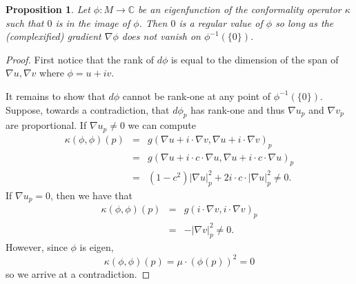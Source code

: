 \documentclass[11pt,reqno]{amsart}
\theoremstyle{plain}
\newtheorem{proposition}  [theorem]  {Proposition}
\theoremstyle{definition}
\numberwithin{equation}{section}
\def \cn{{\mathbb C}}
\numberwithin{equation}{section}
\begin{document}
\begin{proposition}
	Let $\phi: M \to \cn$ be an eigenfunction of the conformality operator $\kappa$ such that $0$ is in the image of $\phi$. Then $0$ is a regular value of $\phi$ so long as the (complexified) gradient $\nabla \phi$ does not vanish on $\phi^{-1}(\{0\})$.
\end{proposition}
\begin{proof}
	First notice that the rank of $d\phi$ is equal to the dimension of the span of $\nabla u,\nabla v$ where $\phi = u + iv$.
	
	It remains to show that $d\phi$ cannot be rank-one at any point of $\phi^{-1}(\{0\})$. Suppose, towards a contradiction, that $d\phi_p$ has rank-one and thus $\nabla u_p$ and $\nabla v_p$ are proportional. If $\nabla u_p \neq 0$ we can compute
	\begin{eqnarray*}
		\kappa(\phi,\phi)(p) &=& g(\nabla u + i \cdot  \nabla v, \nabla u + i \cdot \nabla v)_p \\
		&=& g(\nabla u + i \cdot c \cdot  \nabla u, \nabla u + i \cdot c \cdot \nabla u)_p \\
		&=& (1-c^2)|\nabla u|_p^2 + 2i\cdot c\cdot  |\nabla u|_p^2 \neq 0.
	\end{eqnarray*}
	If $\nabla u_p = 0$, then we have that 
	\begin{eqnarray*}
		\kappa(\phi,\phi)(p) &=& g(i \cdot  \nabla v, i \cdot \nabla v)_p \\
		&=& - |\nabla v|_p^2 \neq 0.
	\end{eqnarray*}
	However, since $\phi$ is eigen,
	$$ \kappa(\phi,\phi)(p) = \mu \cdot (\phi(p))^2 = 0$$
	so we arrive at a contradiction. 
\end{proof}
\end{document}
